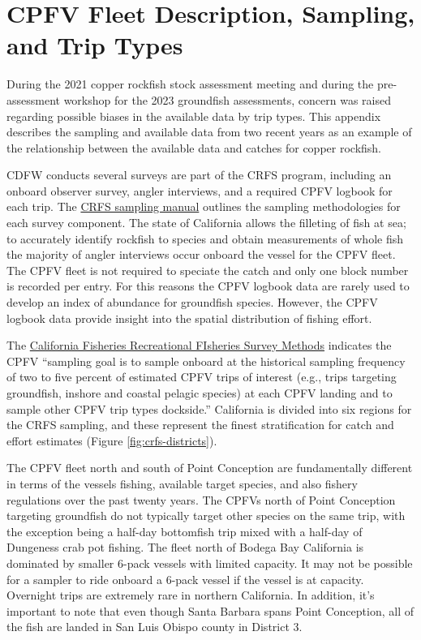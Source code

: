 \documentclass[11pt,
  english,
  letterpaper,
]{article}
\begin{document}
\newpage

\hypertarget{cpfv-samples}{%
\section{CPFV Fleet Description, Sampling, and Trip Types}\label{cpfv-samples}}

During the 2021 copper rockfish stock assessment meeting and during the pre-assessment workshop for the 2023 groundfish assessments, concern was raised regarding possible biases in the available data by trip types. This appendix describes the sampling and available data from two recent years as an example of the relationship between the available data and catches for copper rockfish.

CDFW conducts several surveys are part of the CRFS program, including an onboard observer survey, angler interviews, and a required CPFV logbook for each trip. The \href{https://nrm.dfg.ca.gov/FileHandler.ashx?DocumentID=62348\&inline}{CRFS sampling manual} outlines the sampling methodologies for each survey component. The state of California allows the filleting of fish at sea; to accurately identify rockfish to species and obtain measurements of whole fish the majority of angler interviews occur onboard the vessel for the CPFV fleet. The CPFV fleet is not required to speciate the catch and only one block number is recorded per entry. For this reasons the CPFV logbook data are rarely used to develop an index of abundance for groundfish species. However, the CPFV logbook data provide insight into the spatial distribution of fishing effort.

The \href{https://nrm.dfg.ca.gov/FileHandler.ashx?DocumentID=36136\&inline}{California Fisheries Recreational FIsheries Survey Methods} indicates the CPFV ``sampling goal is to sample onboard at the historical sampling frequency of two to five percent of estimated CPFV trips of interest (e.g., trips targeting groundfish, inshore and coastal pelagic species) at each CPFV landing and to sample other CPFV trip types dockside.'' California is divided into six regions for the CRFS sampling, and these represent the finest stratification for catch and effort estimates (Figure \ref{fig:crfs-districts}).

The CPFV fleet north and south of Point Conception are fundamentally different in terms of the vessels fishing, available target species, and also fishery regulations over the past twenty years. The CPFVs north of Point Conception targeting groundfish do not typically target other species on the same trip, with the exception being a half-day bottomfish trip mixed with a half-day of Dungeness crab pot fishing. The fleet north of Bodega Bay California is dominated by smaller 6-pack vessels with limited capacity. It may not be possible for a sampler to ride onboard a 6-pack vessel if the vessel is at capacity. Overnight trips are extremely rare in northern California. In addition, it's important to note that even though Santa Barbara spans Point Conception, all of the fish are landed in San Luis Obispo county in District 3.
\end{document}

